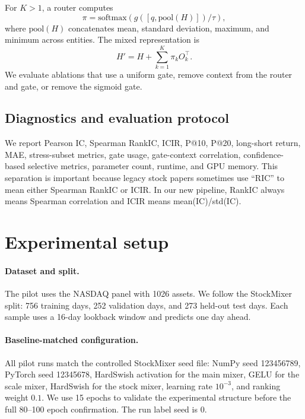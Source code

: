 \documentclass{article}
\begin{document}
For $K>1$, a router computes
\begin{equation}
    \pi = \mathrm{softmax}(g([q, \mathrm{pool}(H)]) / \tau),
\end{equation}
where $\mathrm{pool}(H)$ concatenates mean, standard deviation, maximum, and minimum across entities. The mixed representation is
\begin{equation}
    H' = H + \sum_{k=1}^{K}\pi_k O_k^\top.
\end{equation}
We evaluate ablations that use a uniform gate, remove context from the router and gate, or remove the sigmoid gate.

\subsection{Diagnostics and evaluation protocol}

We report Pearson IC, Spearman RankIC, ICIR, P@10, P@20, long-short return, MAE, stress-subset metrics, gate usage, gate-context correlation, confidence-based selective metrics, parameter count, runtime, and GPU memory. This separation is important because legacy stock papers sometimes use ``RIC'' to mean either Spearman RankIC or ICIR. In our new pipeline, RankIC always means Spearman correlation and ICIR means mean(IC)/std(IC).

\section{Experimental setup}

\paragraph{Dataset and split.}
The pilot uses the NASDAQ panel with 1026 assets. We follow the StockMixer split: 756 training days, 252 validation days, and 273 held-out test days. Each sample uses a 16-day lookback window and predicts one day ahead.

\paragraph{Baseline-matched configuration.}
All pilot runs match the controlled StockMixer seed file: NumPy seed 123456789, PyTorch seed 12345678, HardSwish activation for the main mixer, GELU for the scale mixer, HardSwish for the stock mixer, learning rate $10^{-3}$, and ranking weight $0.1$. We use 15 epochs to validate the experimental structure before the full 80--100 epoch confirmation. The run label seed is 0.
\end{document}
